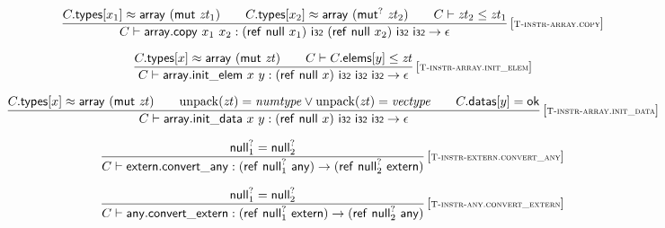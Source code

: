 $$
\begin{array}{@{}c@{}}\displaystyle
\frac{
C{.}\mathsf{types}{}[x_1] \approx \mathsf{array}~(\mathsf{mut}~{\mathit{zt}}_1)
 \qquad
C{.}\mathsf{types}{}[x_2] \approx \mathsf{array}~({\mathsf{mut}^?}~{\mathit{zt}}_2)
 \qquad
C \vdash {\mathit{zt}}_2 \leq {\mathit{zt}}_1
}{
C \vdash \mathsf{array{.}copy}~x_1~x_2 : (\mathsf{ref}~\mathsf{null}~x_1)~\mathsf{i{\scriptstyle 32}}~(\mathsf{ref}~\mathsf{null}~x_2)~\mathsf{i{\scriptstyle 32}}~\mathsf{i{\scriptstyle 32}} \rightarrow \epsilon
} \, {[\textsc{\scriptsize T{-}instr{-}array.copy}]}
\qquad
\end{array}
$$

$$
\begin{array}{@{}c@{}}\displaystyle
\frac{
C{.}\mathsf{types}{}[x] \approx \mathsf{array}~(\mathsf{mut}~{\mathit{zt}})
 \qquad
C \vdash C{.}\mathsf{elems}{}[y] \leq {\mathit{zt}}
}{
C \vdash \mathsf{array{.}init\_elem}~x~y : (\mathsf{ref}~\mathsf{null}~x)~\mathsf{i{\scriptstyle 32}}~\mathsf{i{\scriptstyle 32}}~\mathsf{i{\scriptstyle 32}} \rightarrow \epsilon
} \, {[\textsc{\scriptsize T{-}instr{-}array.init\_elem}]}
\qquad
\end{array}
$$

$$
\begin{array}{@{}c@{}}\displaystyle
\frac{
C{.}\mathsf{types}{}[x] \approx \mathsf{array}~(\mathsf{mut}~{\mathit{zt}})
 \qquad
{\mathrm{unpack}}({\mathit{zt}}) = {\mathit{numtype}} \lor {\mathrm{unpack}}({\mathit{zt}}) = {\mathit{vectype}}
 \qquad
C{.}\mathsf{datas}{}[y] = \mathsf{ok}
}{
C \vdash \mathsf{array{.}init\_data}~x~y : (\mathsf{ref}~\mathsf{null}~x)~\mathsf{i{\scriptstyle 32}}~\mathsf{i{\scriptstyle 32}}~\mathsf{i{\scriptstyle 32}} \rightarrow \epsilon
} \, {[\textsc{\scriptsize T{-}instr{-}array.init\_data}]}
\qquad
\end{array}
$$

\vspace{1ex}

$$
\begin{array}{@{}c@{}}\displaystyle
\frac{
{{\mathsf{null}}_1^?} = {{\mathsf{null}}_2^?}
}{
C \vdash \mathsf{extern{.}convert\_any} : (\mathsf{ref}~{{\mathsf{null}}_1^?}~\mathsf{any}) \rightarrow (\mathsf{ref}~{{\mathsf{null}}_2^?}~\mathsf{extern})
} \, {[\textsc{\scriptsize T{-}instr{-}extern.convert\_any}]}
\qquad
\end{array}
$$

$$
\begin{array}{@{}c@{}}\displaystyle
\frac{
{{\mathsf{null}}_1^?} = {{\mathsf{null}}_2^?}
}{
C \vdash \mathsf{any{.}convert\_extern} : (\mathsf{ref}~{{\mathsf{null}}_1^?}~\mathsf{extern}) \rightarrow (\mathsf{ref}~{{\mathsf{null}}_2^?}~\mathsf{any})
} \, {[\textsc{\scriptsize T{-}instr{-}any.convert\_extern}]}
\qquad
\end{array}
$$

